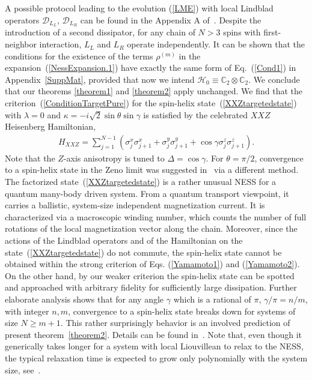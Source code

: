 \documentclass[aps,pra,letterpaper,twocolumn,showpacs,superscriptaddress,floatfix,longbibliography]{revtex4-1}
\begin{document}
A possible protocol leading to the evolution (\ref{LME}) with local
Lindblad operators $\mathcal{D}_{L_L}$, $\mathcal{D}_{L_R}$ can be
found in the Appendix A of~\cite{Landi}.  Despite the introduction of
a second dissipator, for any chain of $N>3$ spins with first-neighbor
interaction, $L_L$ and $L_R$ operate independently. It can be shown
that the conditions for the existence of the terms $\rho^{(m)}$ in the
expansion~(\ref{NessExpansion.1}) have exactly the same form of
Eq.~(\ref{Cond1}) in Appendix~\ref{SuppMat}, provided that now we
intend $\mathcal{H}_0 \equiv \mathbb{C}_2 \otimes \mathbb{C}_2 $.  We
conclude that our theorems \ref{theorem1} and \ref{theorem2} apply
unchanged.  We find that the criterion~(\ref{ConditionTargetPure}) for
the spin-helix state~(\ref{XXZtargetedstate}) with $\lambda=0$ and
$\kappa=-i \sqrt{2} \sin \theta \sin \gamma$ is satisfied by the
celebrated $XXZ$ Heisenberg Hamiltonian,
\begin{align}
  H_{XXZ}= \sum_{j=1}^{N-1} \left( \sigma_{j}^{x}\sigma_{j+1}^{x}+
    \sigma_{j}^{y}\sigma_{j+1}^{y}+ \cos\gamma
    \sigma_{j}^{z}\sigma_{j+1}^{z} \right).
  \label{HamiltonianXXZ}
\end{align}
Note that the $Z$-axis anisotropy is tuned to $\Delta=\cos \gamma$.
For $\theta=\pi/2$, convergence to a spin-helix state in the Zeno
limit was suggested in~\cite{PhysRevA.93.022111} via a different
method.  The factorized state~(\ref{XXZtargetedstate}) is a rather
unusual NESS for a quantum many-body driven system.  From a quantum
transport viewpoint, it carries a ballistic, system-size independent
magnetization current. It is characterized via a macroscopic winding
number, which counts the number of full rotations of the local
magnetization vector along the chain.  Moreover, since the actions of
the Lindblad operators and of the Hamiltonian on the
state~(\ref{XXZtargetedstate}) do not commute, the spin-helix state
cannot be obtained within the strong criterion of
Eqs. (\ref{Yamamoto1}) and (\ref{Yamamoto2}). On the other hand, by
our weaker criterion the spin-helix state can be spotted and
approached with arbitrary fidelity for sufficiently large dissipation.
Further elaborate analysis shows that for any angle $\gamma$ which is
a rational of $\pi$, $\gamma/\pi=n/m$, with integer $n,m$, convergence
to a spin-helix state breaks down for systems of size $N\geq
m+1$. This rather surprisingly behavior is an involved prediction of
present theorem~\ref{theorem2}. Details can be found
in~\cite{PSP2017}.  Note that, even though it generically takes longer
for a system with local Liouvillean to relax to the NESS, the typical
relaxation time is expected to grow only polynomially with the system
size, see~\cite{Znidaric2015}.
\end{document}
